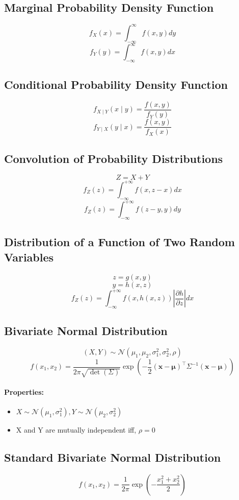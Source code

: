 \documentclass{article}
\begin{document}
\subsection{Marginal Probability Density Function}
\[
    f_X(x) = \int_{-\infty}^{\infty} f(x,y)dy
\]
\[
    f_Y(y) = \int_{-\infty}^{\infty} f(x,y)dx
\]

\subsection{Conditional Probability Density Function}
\[
    f_{X \mid Y}(x \mid y) = \frac{f(x,y)}{f_Y(y)}
\]
\[
    f_{Y \mid X}(y \mid x) = \frac{f(x,y)}{f_X(x)}
\]

\subsection{Convolution of Probability Distributions}
\[
    Z = X + Y
\]
\[
    f_Z(z) = \int_{-\infty}^{+\infty} f(x,z-x)dx
\]
\[
    f_Z(z) = \int_{-\infty}^{+\infty} f(z-y,y)dy
\]

\subsection{Distribution of a Function of Two Random Variables}
\[
    z=g(x,y)
\]
\[
    y=h(x,z)
\]
\[
    f_Z(z) = \int_{-\infty}^{+\infty} f(x,h(x,z)) \left| \frac{\partial h}{\partial z} \right| dx
\]

\subsection{Bivariate Normal Distribution}
\[ (X,Y) \sim \mathcal{N}(\mu_1, \mu_2, \sigma_1^2, \sigma_2^2, \rho) \]
\[
    f(x_1, x_2) = \frac{1}{2\pi\sqrt{\det(\Sigma)}} \exp\left(-\frac{1}{2}(\mathbf{x} - \boldsymbol{\mu})^\top \Sigma^{-1} (\mathbf{x} - \boldsymbol{\mu})\right)
\]

\paragraph{Properties:}
\begin{itemize}
    \item $ X \sim \mathcal{N}(\mu_1, \sigma_1^2), Y \sim \mathcal{N}(\mu_2, \sigma_2^2) $
    \item X and Y are mutually independent iff, $ \rho = 0 $
\end{itemize}

\subsection{Standard Bivariate Normal Distribution}
\[
    f(x_1, x_2) = \frac{1}{2\pi} \exp\left(-\frac{x_1^2 + x_2^2}{2}\right)
\]
\end{document}
